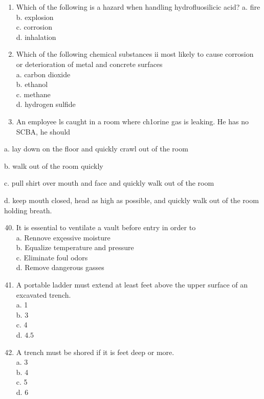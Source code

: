 \documentclass[10pt]{article}
\begin{document}
\begin{enumerate}
\begin{enumerate}
\begin{enumerate}
  \item Which of the following is a hazard when handling hydrofluosilicic acid?
a. fire\\
b. explosion\\
c. corrosion\\
d. inhalation\\

  \item Which of the following chemical substances ii most likely to cause corrosion or deterioration of metal and concrete surfaces\\
a. carbon dioxide\\
b. ethanol\\
c. methane\\
d. hydrogen sulfide\\

  \item An employee ls caught in a room where ch1orine gas is leaking. He has no SCBA, he should

\end{enumerate}

a. lay down on the floor and quickly crawl out of the room

b. walk out of the room quickly

c. pull shirt over mouth and face and quickly walk out of the room

d. keep mouth closed, head as high as possible, and quickly walk out of the room holding breath.\\

\begin{enumerate}
  \setcounter{enumi}{39}
  \item It is essential to ventilate a vault before entry in order to\\
a. Rennove exçessive moisture\\
b. Equalize temperature and pressure\\
c. Eliminate foul odors\\
d. Remove dangerous gasses\\

  \item A portable ladder must extend at least feet above the upper surface of an excavated trench.\\
a. 1\\
b. 3\\
c. 4\\
d. $4.5$\\

  \item A trench must be shored if it is feet deep or more.\\
a. 3\\
b. 4\\
c. 5\\
d. 6\\


\end{enumerate}
\end{enumerate}
\end{enumerate}
\end{document}
